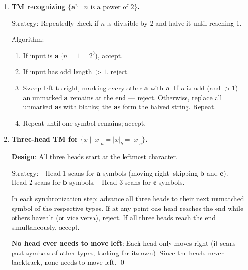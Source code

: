 \begin{enumerate}[{11.}1. ]
\begin{enumerate}
The head of the two-track TM simulates both directions: moving right on Track 1 corresponds to moving right; moving left (if at cell 0) switches to Track 2 and moves right.

\item \textbf{Equivalence proof}: By induction on the number of TM steps:
- Each step of $M$ corresponds to a step (or at most two steps) of the two-track machine.
- The content of the two tracks correctly represents the bi-infinite tape of $M$.
- Acceptance/rejection conditions are preserved. \qed
\end{enumerate}

\item \textbf{TM recognizing $\{\pmb{a}^n \mid n \text{ is a power of 2}\}$.}

Strategy: Repeatedly check if $n$ is divisible by 2 and halve it until reaching 1.

Algorithm:
\begin{enumerate}[1.]
\item If input is $\pmb{a}$ ($n=1=2^0$), accept.
\item If input has odd length $> 1$, reject.
\item Sweep left to right, marking every other $\pmb{a}$ with $\overline{\pmb{a}}$. If $n$ is odd (and $>1$) an unmarked $\pmb{a}$ remains at the end — reject. Otherwise, replace all unmarked $\pmb{a}$s with blanks; the $\overline{\pmb{a}}$s form the halved string. Repeat.
\item Repeat until one symbol remains; accept.
\end{enumerate}

\item \textbf{Three-head TM for $\{x \mid |x|_a = |x|_b = |x|_c\}$.}

\textbf{Design}: All three heads start at the leftmost character.

Strategy:
- Head 1 scans for $\pmb{a}$-symbols (moving right, skipping $\pmb{b}$ and $\pmb{c}$).
- Head 2 scans for $\pmb{b}$-symbols.
- Head 3 scans for $\pmb{c}$-symbols.

In each synchronization step: advance all three heads to their next unmatched symbol of the respective types. If at any point one head reaches the end while others haven't (or vice versa), reject. If all three heads reach the end simultaneously, accept.

\textbf{No head ever needs to move left}: Each head only moves right (it scans past symbols of other types, looking for its own). Since the heads never backtrack, none needs to move left. \qed


\end{enumerate}
